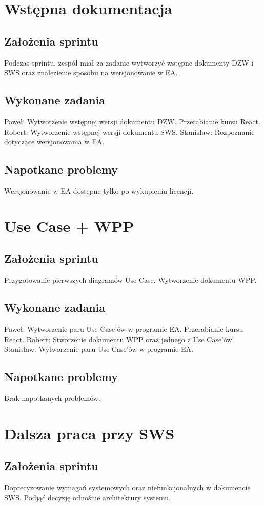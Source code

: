 \documentclass[a4paper,11pt]{report}
\begin{document}
\section {Wstępna dokumentacja}
\subsection {Założenia sprintu}
Podczas sprintu, zespół miał za zadanie wytworzyć wstępne dokumenty DZW i SWS oraz znalezienie sposobu na wersjonowanie w EA.
\subsection {Wykonane zadania}
Paweł: Wytworzenie wstępnej wersji dokumentu DZW. Przerabianie kursu React.
Robert: Wytworzenie wstępnej wersji dokumentu SWS.
Stanisław: Rozpoznanie dotyczące wersjonowania w EA.
\subsection {Napotkane problemy}
Wersjonowanie w EA dostępne tylko po wykupieniu licencji.

\section {Use Case + WPP}
\subsection {Założenia sprintu}
Przygotowanie pierwszych diagramów Use Case. Wytworzenie dokumentu WPP.
\subsection {Wykonane zadania}
Paweł: Wytworzenie paru Use Case'ów w programie EA. Przerabianie kursu React.
Robert: Stworzenie dokumentu WPP oraz jednego z Use Case'ów.
Stanisław: Wytworzenie paru Use Case'ów w programie EA.
\subsection {Napotkane problemy}
Brak napotkanych problemów.

\section {Dalsza praca przy SWS}
\subsection {Założenia sprintu}
Doprecyzowanie wymagań systemowych oraz niefunkcjonalnych w dokumencie SWS. Podjąć decyzję odnośnie architektury systemu.
\end{document}
